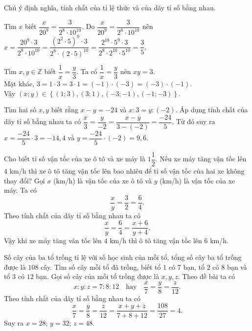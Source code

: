\begin{dang}
Chú ý định nghĩa, tính chất của tỉ lệ thức và của dãy tỉ số bằng nhau.
\end{dang}
\begin{vd}
Tìm $x$ biết $\dfrac{x}{20^9}=\dfrac{3}{2^8\cdot 10^{10}}$.
\loigiai
{
Do $\dfrac{x}{20^9}=\dfrac{3}{2^8\cdot 10^{10}}$ nên $x=\dfrac{20^9\cdot 3}{2^8\cdot 10^{10}}=\dfrac{(2^2\cdot 5)^9\cdot 3}{2^8\cdot (2\cdot 5)^{10}}=\dfrac{2^{18}\cdot 5^9\cdot 3}{2^8\cdot 2^{10}\cdot 5^10}=\dfrac{3}{5}.$
}
\end{vd}
\begin{vd}
Tìm $x,y\in\mathbb{Z}$ biết $\dfrac{1}{x}=\dfrac{y}{3}$.
\loigiai
{
Ta có $\dfrac{1}{x}=\dfrac{y}{3}$ nên $xy=3$.\\
Mặt khác, $3=1\cdot 3=3\cdot 1=(-1)\cdot (-3)=(-3)\cdot (-1)$.\\
Vậy $(x;y)\in\left\{(1;3), (3;1), (-3;-1), (-1;-3)\right\}.$
}
\end{vd}
\begin{vd}
Tìm hai số $x,y$ biết rằng $x-y=-24$ và $x:3=y:(-2)$.
\loigiai
{
Áp dụng tính chất của dãy tỉ số bằng nhau ta có $\dfrac{x}{3}=\dfrac{y}{-2}=\dfrac{x-y}{3-(-2)}=\dfrac{-24}{5}$. Từ đó suy ra $x=\dfrac{-24}{5}\cdot 3=-14,4$ và $y=\dfrac{-24}{5}\cdot (-2)=9,6$.
}
\end{vd}
\begin{vd}
Cho biết tỉ số vận tốc của xe ô tô và xe máy là $1\dfrac{1}{2}$. Nếu xe máy tăng vận tốc lên $4$ km/h thì xe ô tô tăng vận tốc lên bao nhiêu để tỉ số vận tốc của hai xe không thay đổi?
\loigiai
{
Gọi $x$ (km/h) là vận tốc của xe ô tô và $y$ (km/h) là vận tốc của xe máy. Ta có $$\dfrac{x}{y}=\dfrac{3}{2}=\dfrac{6}{4}.$$
Theo tính chất của dãy tỉ số bằng nhau ta có $$\dfrac{x}{y}=\dfrac{6}{4}=\dfrac{x+6}{y+4}.$$
Vậy khi xe máy tăng vân tốc lên $4$ km/h thì ô tô tăng vận tốc lên $6$ km/h.
}
\end{vd}
\begin{vd}
Số cây của ba tổ trồng tỉ lệ với số học sinh của mỗi tổ, tổng số cây ba tổ trồng được là $108$ cây. Tìm số cây mỗi tổ đã trồng, biết tổ $1$ có $7$ bạn, tổ $2$ có $8$ bạn và tổ $3$ có $12$ bạn.
\loigiai
{
Gọi số cây của mỗi tổ trồng được là $x,y,z$. Theo đề bài ta có
$$x:y:z=7:8:12\quad \text{hay}\quad \dfrac{x}{7}=\dfrac{y}{8}=\dfrac{z}{12}.$$
Theo tính chất của dãy tỉ số bằng nhau ta có
$$\dfrac{x}{7}=\dfrac{y}{8}=\dfrac{z}{12}=\dfrac{x+y+z}{7+8+12}=\dfrac{108}{27}=4.$$
Suy ra $x=28$; $y=32$; $z=48$.
}
\end{vd}
